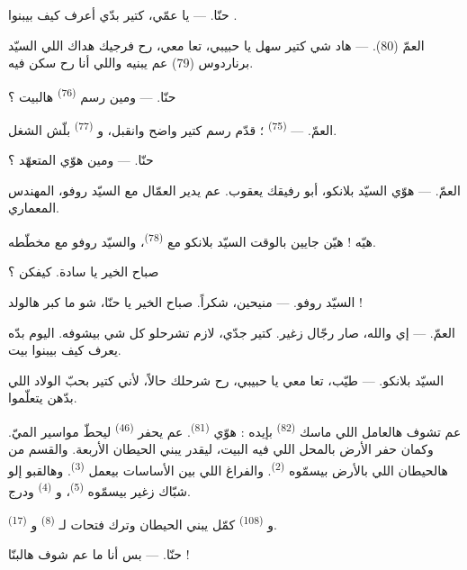 \textsc{حنّا}. --- يا عمّي، كتير بدّي أعرف كيف بيبنوا .

\textsc{العمّ} (80). --- هاد شي كتير سهل يا حبيبي، تعا معي، رح فرجيك
هداك اللي السيّد برناردوس (79) عم يبنيه واللي أنا رح سكن فيه.

\textsc{حنّا}. --- ومين رسم  \textsuperscript{(76)} هالبيت ؟

\textsc{العمّ}. ---  \textsuperscript{(75)} ؛ قدّم رسم
كتير واضح وانقبل، و \textsuperscript{(77)} بلّش الشغل.

\textsc{حنّا}. --- ومين هوّي المتعهّد ؟

\textsc{العمّ}. --- هوّي السيّد بلانكو، أبو رفيقك يعقوب. عم يدير
العمّال مع السيّد روفو، المهندس المعماري.

هيّه ! هيّن جايين بالوقت السيّد بلانكو مع 
\textsuperscript{(78)}، والسيّد روفو مع مخطّطه.

صباح الخير يا سادة. كيفكن ؟

\textsc{السيّد روفو}. --- منيحين، شكراً. صباح الخير يا حنّا، شو ما
كبر هالولد !

\textsc{العمّ}. --- إي والله، صار رجّال زغير. كتير جدّي، لازم تشرحلو كل
شي بيشوفه. اليوم بدّه يعرف كيف بيبنوا بيت.

\VUsaut{3.0mm}

\textsc{السيّد بلانكو}. --- طيّب، تعا معي يا حبيبي، رح شرحلك حالاً،
لأني كتير بحبّ الولاد اللي بدّهن يتعلّموا.

عم تشوف هالعامل اللي ماسك  \textsuperscript{(82)} بإيده : هوّي
 \textsuperscript{(81)}. عم يحفر 
\textsuperscript{(46)} ليحطّ مواسير الميّ. وكمان حفر الأرض بالمحل اللي
فيه البيت، ليقدر  يبني الحيطان الأربعة. والقسم من
هالحيطان اللي بالأرض بيسمّوه  \textsuperscript{(2)}. والفراغ
اللي بين الأساسات بيعمل  \textsuperscript{(3)}. وهالقبو إلو
شبّاك زغير بيسمّوه  \textsuperscript{(5)}، و
\textsuperscript{(4)} ودرج.

و \textsuperscript{(108)} كمّل يبني الحيطان وترك فتحات
لـ \textsuperscript{(8)} و \textsuperscript{(17)}.

\textsc{حنّا}. --- بس أنا ما عم شوف هالبنّا !

